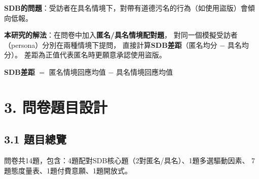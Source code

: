 \documentclass[12pt, a4paper]{article}
\begin{document}
\textbf{SDB的問題}：受訪者在具名情境下，對帶有道德污名的行為（如使用盜版）會傾向低報。

\textbf{本研究的解法}：在問卷中加入\textbf{匿名/具名情境配對題}，
對同一個模擬受訪者（persona）分別在兩種情境下提問，
直接計算\textbf{SDB差距}（匿名均分 $-$ 具名均分）。
差距為正值代表匿名時更願意承認使用盜版。

\begin{center}
\textbf{SDB差距} $=$ 匿名情境回應均值 $-$ 具名情境回應均值
\end{center}

\section{3. 問卷題目設計}

\subsection{3.1 題目總覽}

問卷共14題，包含：4題配對SDB核心題（2對匿名/具名）、1題多選驅動因素、
7題態度量表、1題付費意願、1題開放式。
\end{document}
